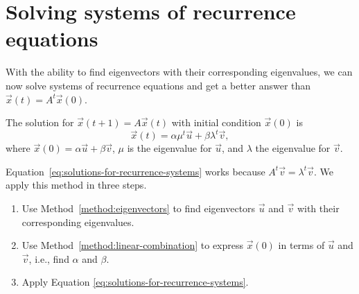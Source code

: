 \documentclass[../main.tex]{subfiles}
\begin{document}
 \section{Solving systems of recurrence equations}
With the ability to find eigenvectors with their corresponding eigenvalues, we can now solve systems of recurrence equations and get a better answer  than \(\vec{x}(t) = A^{t} \vec{x}(0)\).

\begin{method} \label{method:recurrences-system}
  The solution for \(\vec{x}(t + 1) = A\vec{x}(t)\) with initial condition \(\vec{x}(0)\) is
  \begin{equation} \label{eq:solutions-for-recurrence-systems}
    \vec{x}(t) = \alpha \mu^{t} \vec{u} + \beta \lambda^{t} \vec{v},
  \end{equation}
  where \(\vec{x}(0) = \alpha \vec{u} + \beta \vec{v}\), \(\mu\) is the eigenvalue for \(\vec{u}\), and \(\lambda\) the eigenvalue for \(\vec{v}\).

  Equation~\eqref{eq:solutions-for-recurrence-systems} works because \(A^{t} \vec{v} = \lambda^{t} \vec{v}\). We apply this method in three steps.
  \begin{enumerate}
    \item Use Method~\ref{method:eigenvectors} to find eigenvectors \(\vec{u}\) and \(\vec{v}\) with their corresponding eigenvalues. 
    \item Use Method~\ref{method:linear-combination} to express \(\vec{x}(0)\) in terms of \(\vec{u}\) and \(\vec{v}\), i.e., find \(\alpha\) and \(\beta\).
    \item Apply Equation \eqref{eq:solutions-for-recurrence-systems}.
  \end{enumerate}
\end{method}
\end{document}
